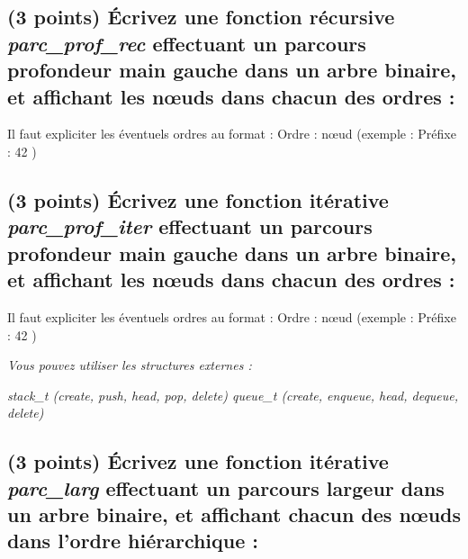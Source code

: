 \documentclass[11pt,a4paper]{article}
\begin{document}

\subsection{(3 points) \'Ecrivez une fonction récursive \og \textit{parc\_prof\_rec} \fg{} effectuant un parcours profondeur main gauche dans un arbre binaire, et affichant les nœuds dans chacun des ordres : }

\noindent Il faut expliciter les éventuels ordres au format : \og Ordre : nœud \fg{} (exemple : \og Préfixe : 42 \fg{})

\begin{center}
\end{center}



\clearpage


\subsection{(3 points) \'Ecrivez une fonction itérative \og \textit{parc\_prof\_iter} \fg{} effectuant un parcours profondeur main gauche dans un arbre binaire, et affichant les nœuds dans chacun des ordres : }

\noindent Il faut expliciter les éventuels ordres au format : \og Ordre : nœud \fg{} (exemple : \og Préfixe : 42 \fg{})

\medskip

\noindent \textit{Vous pouvez utiliser les structures externes :}

\noindent \textit{stack\_t (create, push, head, pop, delete) \hfill queue\_t (create, enqueue, head, dequeue, delete) }

\begin{center}
\end{center}

\clearpage


\subsection{(3 points) \'Ecrivez une fonction itérative \og \textit{parc\_larg} \fg{} effectuant un parcours largeur dans un arbre binaire, et affichant chacun des nœuds dans l'ordre hiérarchique : }
\end{document}
